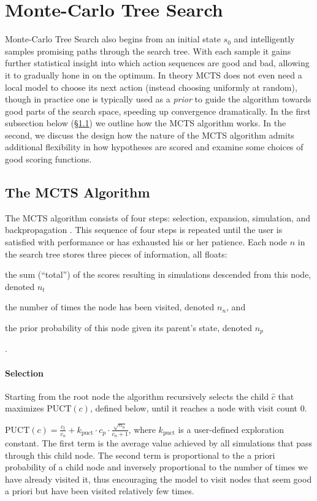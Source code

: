 \documentclass[11pt,a4paper]{article}
\begin{document}
\section{Monte-Carlo Tree Search}
\label{sec:mcts}
Monte-Carlo Tree Search also begins from an initial state $s_0$ and intelligently
samples promising paths through the search tree. With each sample it gains further
statistical insight into which action sequences are good and bad, allowing it
to gradually hone in on the optimum. In theory MCTS
does not even need a local model to choose its next action (instead choosing
uniformly at random), though in practice one is typically used as a \emph{prior}
to guide the algorithm towards good parts of
the search space, speeding up convergence dramatically.
 In the first subsection below (\S \ref{sec:mcts_alg})
we outline how the MCTS algorithm works.
In the second, we discuss the design how the nature of the MCTS algorithm
admits additional flexibility in how hypotheses are scored and examine
some choices of good scoring functions.

\subsection{The MCTS Algorithm}
\label{sec:mcts_alg}
The MCTS algorithm consists of four steps: selection, expansion, simulation,
and backpropagation \cite{chaslot2008progressive}. This sequence of four steps
is repeated until the user is satisfied with performance or has exhausted his or
her patience. Each node $n$ in the search tree stores three pieces of
information, all floats:
\begin{enumerate*}[(1)]
\item the sum (``total'') of the scores resulting in simulations descended from this node, denoted $n_t$
\item the number of times the node has been visited, denoted $n_n$, and
\item the prior probability of this node given its parent's state, denoted $n_p$
\end{enumerate*}.

\paragraph{Selection}
Starting from the root node the algorithm recursively selects the child
$\hat{c}$ that maximizes $\text{PUCT}(c)$, defined below, until it reaches a
node with visit count 0.

$\text{PUCT}(c) = \frac{c_t}{c_n} + k_{\text{puct}} \cdot c_p \cdot
\frac{\sqrt{n_n}}{c_n + 1}$, where $k_{\text{puct}}$ is a user-defined
exploration constant. The first term is the average value achieved by all
simulations that pass through this child node. The second term is proportional
to the a priori probability of a child node and inversely proportional to the
number of times we have already visited it, thus encouraging the model to visit
nodes that seem good a priori but have been visited relatively few times.
\end{document}
